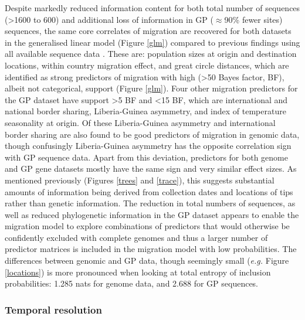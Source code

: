 \documentclass[11pt,oneside,letterpaper]{article}
\begin{document}
Despite markedly reduced information content for both total number of sequences (>1600 to 600) and additional loss of information in GP ($\approx$90\% fewer sites) sequences, the same core correlates of migration are recovered for both datasets in the generalised linear model (Figure \ref{glm}) compared to previous findings using all available sequence data \citep{dudas_virus_2017}.
These are: population sizes at origin and destination locations, within country migration effect, and great circle distances, which are identified as strong predictors of migration with high (>50 Bayes factor, BF), albeit not categorical, support (Figure \ref{glm}).
Four other migration predictors for the GP dataset have support >5 BF and <15 BF, which are international and national border sharing, Liberia-Guinea asymmetry, and index of temperature seasonality at origin.
Of these Liberia-Guinea asymmetry and international border sharing are also found to be good predictors of migration in genomic data, though confusingly Liberia-Guinea asymmetry has the opposite correlation sign with GP sequence data.
Apart from this deviation, predictors for both genome and GP gene datasets mostly have the same sign and very similar effect sizes.
As mentioned previously (Figures \ref{trees} and \ref{trace}), this suggests substantial amounts of information being derived from collection dates and locations of tips rather than genetic information.
The reduction in total numbers of sequences, as well as reduced phylogenetic information in the GP dataset appears to enable the migration model to explore combinations of predictors that would otherwise be confidently excluded with complete genomes and thus a larger number of predictor matrices is included in the migration model with low probabilities.
The differences between genomic and GP data, though seemingly small (\textit{e.g.} Figure \ref{locations}) is more pronounced when looking at total entropy of inclusion probabilities: 1.285 nats for genome data, and 2.688 for GP sequences.

\subsubsection*{Temporal resolution}
\end{document}
